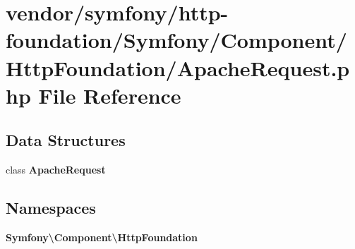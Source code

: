 \section{vendor/symfony/http-\/foundation/\+Symfony/\+Component/\+Http\+Foundation/\+Apache\+Request.php File Reference}
\label{_apache_request_8php}
\subsection*{Data Structures}
\begin{DoxyCompactItemize}
\item 
class {\bf Apache\+Request}
\end{DoxyCompactItemize}
\subsection*{Namespaces}
\begin{DoxyCompactItemize}
\item 
 {\bf Symfony\textbackslash{}\+Component\textbackslash{}\+Http\+Foundation}
\end{DoxyCompactItemize}
